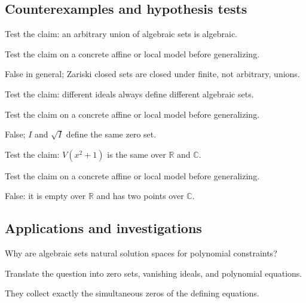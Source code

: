 \subsection*{Counterexamples and hypothesis tests}

\begin{exercise}\label{exr:vi01-expand-10}
Test the claim: an arbitrary union of algebraic sets is algebraic.
\end{exercise}
\begin{hint}
Test the claim on a concrete affine or local model before generalizing.
\end{hint}
\begin{solution}
False in general; Zariski closed sets are closed under finite, not arbitrary, unions.
\end{solution}

\begin{exercise}\label{exr:vi01-expand-11}
Test the claim: different ideals always define different algebraic sets.
\end{exercise}
\begin{hint}
Test the claim on a concrete affine or local model before generalizing.
\end{hint}
\begin{solution}
False; $I$ and $\sqrt I$ define the same zero set.
\end{solution}

\begin{exercise}\label{exr:vi01-expand-12}
Test the claim: $V(x^2+1)$ is the same over $\mathbb R$ and $\mathbb C$.
\end{exercise}
\begin{hint}
Test the claim on a concrete affine or local model before generalizing.
\end{hint}
\begin{solution}
False: it is empty over $\mathbb R$ and has two points over $\mathbb C$.
\end{solution}

\subsection*{Applications and investigations}

\begin{exercise}\label{exr:vi01-expand-13}
Why are algebraic sets natural solution spaces for polynomial constraints?
\end{exercise}
\begin{hint}
Translate the question into zero sets, vanishing ideals, and polynomial equations.
\end{hint}
\begin{solution}
They collect exactly the simultaneous zeros of the defining equations.
\end{solution}


